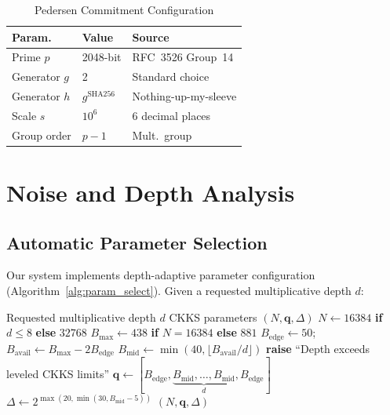 \begin{table}[H]
\centering
\caption{Pedersen Commitment Configuration}
\label{tab:pedersen_params}
\footnotesize
\begin{tabular}{@{}lp{2cm}p{3cm}@{}}
\toprule
\textbf{Param.} & \textbf{Value} & \textbf{Source} \\
\midrule
Prime $p$ & 2048-bit & RFC~3526 Group~14 \\
Generator $g$ & 2 & Standard choice \\
Generator $h$ & $g^{\text{SHA256}}$ & Nothing-up-my-sleeve \\
Scale $s$ & $10^6$ & 6 decimal places \\
Group order & $p - 1$ & Mult.\ group \\
\bottomrule
\end{tabular}
\end{table}

\section{Noise and Depth Analysis}
\label{sec:noise}

\subsection{Automatic Parameter Selection}

Our system implements depth-adaptive parameter configuration (Algorithm~\ref{alg:param_select}). Given a requested multiplicative depth $d$:

\begin{algorithm}[htbp]
\caption{Automatic FHE Parameter Selection}
\label{alg:param_select}
\begin{algorithmic}[1]
\REQUIRE Requested multiplicative depth $d$
\ENSURE CKKS parameters $(N, \mathbf{q}, \Delta)$
\STATE $N \leftarrow 16384$ \textbf{if} $d \leq 8$ \textbf{else} $32768$
\STATE $B_{\max} \leftarrow 438$ \textbf{if} $N = 16384$ \textbf{else} $881$
\STATE $B_{\text{edge}} \leftarrow 50$; \quad $B_{\text{avail}} \leftarrow B_{\max} - 2 B_{\text{edge}}$
\STATE $B_{\text{mid}} \leftarrow \min(40, \lfloor B_{\text{avail}} / d \rfloor)$
    \STATE \textbf{raise} ``Depth exceeds leveled CKKS limits''
\ENDIF
\STATE $\mathbf{q} \leftarrow [B_{\text{edge}}, \underbrace{B_{\text{mid}}, \ldots, B_{\text{mid}}}_{d}, B_{\text{edge}}]$
\STATE $\Delta \leftarrow 2^{\max(20, \min(30, B_{\text{mid}} - 5))}$
\RETURN $(N, \mathbf{q}, \Delta)$
\end{algorithmic}
\end{algorithm}

